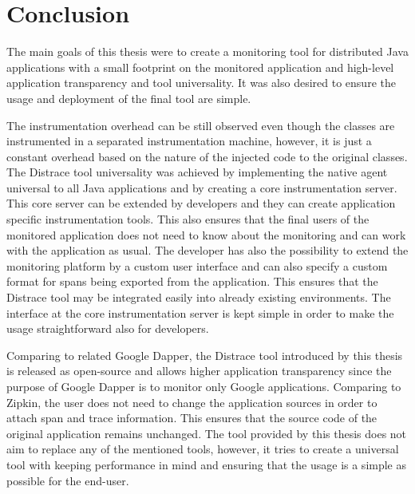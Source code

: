 \chapter{Conclusion}
The main goals of this thesis were to create a monitoring tool for distributed Java applications with a small footprint on the monitored application and high-level application transparency and tool universality. It was also desired to ensure the usage and deployment of the final tool are simple. 

The instrumentation overhead can be still observed even though the classes are instrumented in a separated instrumentation machine, however, it is just a constant overhead based on the nature of the injected code to the original classes. The Distrace tool universality was achieved by implementing the native agent universal to all Java applications and by creating a core instrumentation server. This core server can be extended by developers and they can create application specific instrumentation tools. This also ensures that the final users of the monitored application does not need to know about the monitoring and can work with the application as usual. The developer has also the possibility to extend the monitoring platform by a custom user interface and can also specify a custom format for spans being exported from the application. This ensures that the Distrace tool may be integrated easily into already existing environments. The interface at the core instrumentation server is kept simple in order to make the usage straightforward also for developers.

Comparing to related Google Dapper, the Distrace tool introduced by this thesis is released as open-source and allows higher application transparency since the purpose of Google Dapper is to monitor only Google applications. Comparing to Zipkin, the user does not need to change the application sources in order to attach span and trace information. This ensures that the source code of the original application remains unchanged. The tool provided by this thesis does not aim to replace any of the mentioned tools, however, it tries to create a universal tool with keeping performance in mind and ensuring that the usage is a simple as possible for the end-user.


